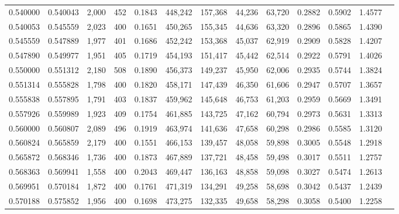 \begin{tabular}{rrrrrrrrrrrrr}
0.540000 & 0.540043 &  2,000 &   452 &                                     0.1843 & 448,242 & 157,368 &  44,236 &  63,720 & 0.2882 & 0.5902 & 1.4577 \\
0.540053 & 0.545559 &  2,023 &   400 &                                     0.1651 & 450,265 & 155,345 &  44,636 &  63,320 & 0.2896 & 0.5865 & 1.4390 \\
0.545559 & 0.547889 &  1,977 &   401 &                                     0.1686 & 452,242 & 153,368 &  45,037 &  62,919 & 0.2909 & 0.5828 & 1.4207 \\
0.547890 & 0.549977 &  1,951 &   405 &                                     0.1719 & 454,193 & 151,417 &  45,442 &  62,514 & 0.2922 & 0.5791 & 1.4026 \\
0.550000 & 0.551312 &  2,180 &   508 &                                     0.1890 & 456,373 & 149,237 &  45,950 &  62,006 & 0.2935 & 0.5744 & 1.3824 \\
0.551314 & 0.555828 &  1,798 &   400 &                                     0.1820 & 458,171 & 147,439 &  46,350 &  61,606 & 0.2947 & 0.5707 & 1.3657 \\
0.555838 & 0.557895 &  1,791 &   403 &                                     0.1837 & 459,962 & 145,648 &  46,753 &  61,203 & 0.2959 & 0.5669 & 1.3491 \\
0.557926 & 0.559989 &  1,923 &   409 &                                     0.1754 & 461,885 & 143,725 &  47,162 &  60,794 & 0.2973 & 0.5631 & 1.3313 \\
0.560000 & 0.560807 &  2,089 &   496 &                                     0.1919 & 463,974 & 141,636 &  47,658 &  60,298 & 0.2986 & 0.5585 & 1.3120 \\
0.560824 & 0.565859 &  2,179 &   400 &                                     0.1551 & 466,153 & 139,457 &  48,058 &  59,898 & 0.3005 & 0.5548 & 1.2918 \\
0.565872 & 0.568346 &  1,736 &   400 &                                     0.1873 & 467,889 & 137,721 &  48,458 &  59,498 & 0.3017 & 0.5511 & 1.2757 \\
0.568363 & 0.569941 &  1,558 &   400 &                                     0.2043 & 469,447 & 136,163 &  48,858 &  59,098 & 0.3027 & 0.5474 & 1.2613 \\
0.569951 & 0.570184 &  1,872 &   400 &                                     0.1761 & 471,319 & 134,291 &  49,258 &  58,698 & 0.3042 & 0.5437 & 1.2439 \\
0.570188 & 0.575852 &  1,956 &   400 &                                     0.1698 & 473,275 & 132,335 &  49,658 &  58,298 & 0.3058 & 0.5400 & 1.2258 \\

\end{tabular}
